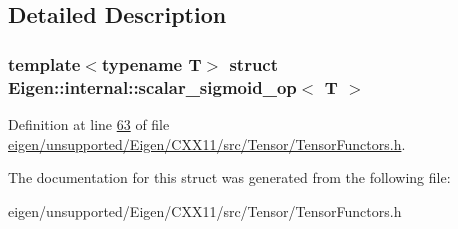 \subsection{Detailed Description}
\subsubsection*{template$<$typename T$>$\newline
struct Eigen\+::internal\+::scalar\+\_\+sigmoid\+\_\+op$<$ T $>$}



Definition at line \hyperlink{eigen_2unsupported_2_eigen_2_c_x_x11_2src_2_tensor_2_tensor_functors_8h_source_l00063}{63} of file \hyperlink{eigen_2unsupported_2_eigen_2_c_x_x11_2src_2_tensor_2_tensor_functors_8h_source}{eigen/unsupported/\+Eigen/\+C\+X\+X11/src/\+Tensor/\+Tensor\+Functors.\+h}.



The documentation for this struct was generated from the following file\+:\begin{DoxyCompactItemize}
\item 
eigen/unsupported/\+Eigen/\+C\+X\+X11/src/\+Tensor/\+Tensor\+Functors.\+h\end{DoxyCompactItemize}
